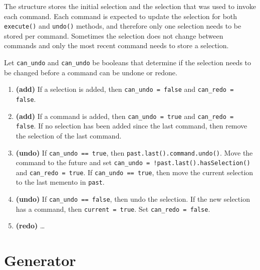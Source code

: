 \documentclass[11pt,letterpaper]{article}
\begin{document}
The structure stores the initial selection and the selection that was used to invoke each command. Each command is expected to update the selection for both \texttt{execute()} and \texttt{undo()} methods, and therefore only one selection needs to be stored per command. Sometimes the selection does not change between commands and only the most recent command needs to store a selection.

Let \texttt{can\_undo} and \texttt{can\_undo} be booleans that determine if the selection needs to be changed before a command can be undone or redone.
\begin{enumerate}
\item \textbf{(add)} If a selection is added, then \texttt{can\_undo = false} and \texttt{can\_redo = false}.

\item \textbf{(add)} If a command is added, then \texttt{can\_undo = true} and \texttt{can\_redo = false}. If no selection has been added since the last command, then remove the selection of the last command.

\item \textbf{(undo)} If \texttt{can\_undo == true}, then \texttt{past.last().command.undo()}. Move the command to the future and set \texttt{can\_undo = !past.last().hasSelection()} and \texttt{can\_redo = true}. If \texttt{can\_undo == true}, then move the current selection to the last memento in \texttt{past}.

\item \textbf{(undo)} If \texttt{can\_undo == false}, then undo the selection. If the new selection has a command, then \texttt{current = true}. Set \texttt{can\_redo = false}.

\item \textbf{(redo)} \ldots

\end{enumerate}

\section{Generator}
\end{document}
